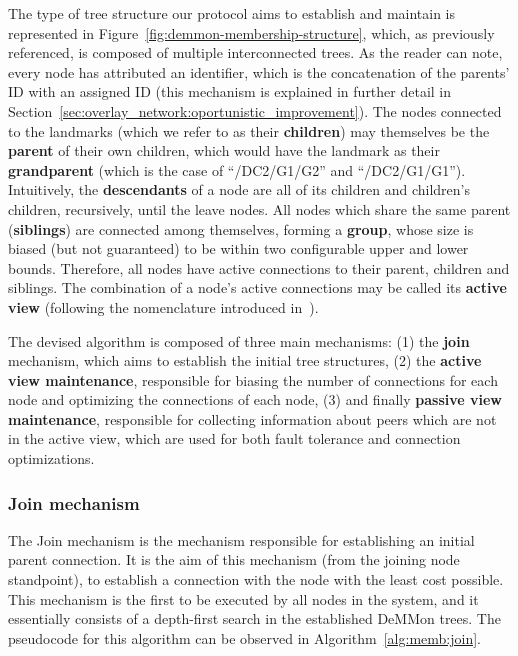 The type of tree structure our protocol aims to establish and maintain is represented in Figure~\ref{fig:demmon-membership-structure}, which, as previously referenced, is composed of multiple interconnected trees. As the reader can note, every node has attributed an identifier, which is the concatenation of the parents' ID with an assigned ID (this mechanism is explained in further detail in Section~\ref{sec:overlay_network:oportunistic_improvement}). The nodes connected to the landmarks (which we refer to as their \textbf{children}) may themselves be the \textbf{parent} of their own children, which would have the landmark as their \textbf{grandparent} (which is the case of ``/DC2/G1/G2'' and ``/DC2/G1/G1''). Intuitively, the \textbf{descendants} of a node are all of its children and children's children, recursively, until the leave nodes. All nodes which share the same parent (\textbf{siblings}) are connected among themselves, forming a \textbf{group}, whose size is biased (but not guaranteed) to be within two configurable upper and lower bounds. Therefore, all nodes have active connections to their parent, children and siblings. The combination of a node's active connections may be called its \textbf{active view} (following the nomenclature introduced in~\cite{Hyparview}). 

The devised algorithm is composed of three main mechanisms: (1) the \textbf{join} mechanism, which aims to establish the initial tree structures, (2) the \textbf{active view maintenance}, responsible for biasing the number of connections for each node and optimizing the connections of each node, (3)  and finally \textbf{passive view maintenance}, responsible for collecting information about peers which are not in the active view, which are used for both fault tolerance and connection optimizations.

\subsubsection{Join mechanism} \label{sec:overlay_network:join}

The Join mechanism is the mechanism responsible for establishing an initial parent connection. It is the aim of this mechanism (from the joining node standpoint), to establish a connection with the node with the least cost possible. This mechanism is the first to be executed by all nodes in the system, and it essentially consists of a depth-first search in the established DeMMon trees. The pseudocode for this algorithm can be observed in Algorithm~\ref{alg:memb:join}. 

